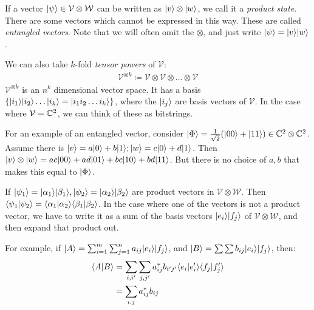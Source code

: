 \documentclass[10pt,a4paper]{article}
\begin{document}
If a vector $|\psi\rangle \in \mathcal{V}\otimes\mathcal{W}$ can be written as $|v\rangle\otimes |w\rangle$, we call it a \emph{product state}. There are some vectors which cannot be expressed in this way. These are called \emph{entangled vectors}. Note that we will often omit the $\otimes$, and just write $|\psi\rangle = |v\rangle|w\rangle$.

We can also take $k$-fold \emph{tensor powers} of $\mathcal{V}$:
\begin{align*}
\mathcal{V}^{\otimes k} \coloneqq \mathcal{V}\otimes \mathcal{V}\otimes\ldots \otimes \mathcal{V}
\end{align*}
$\mathcal{V}^{\otimes k}$ is an $n^k$ dimensional vector space. It has a basis $\{|i_1\rangle|i_2\rangle\ldots|i_k\rangle = |i_1i_2\ldots i_k\rangle\}$, where the $|i_j\rangle$ are basis vectors of $\mathcal{V}$. In the case where $\mathcal{V} = \mathbb{C}^2$, we can think of these as bitstrings.

For an example of an entangled vector, consider $|\Phi\rangle = \frac{1}{\sqrt{2}}(|00\rangle + |11\rangle) \in \mathbb{C}^2 \otimes \mathbb{C}^2$. Assume there is $|v\rangle = a|0\rangle + b|1\rangle; |w\rangle = c|0\rangle + d|1\rangle$. Then $|v\rangle\otimes|w\rangle = ac|00\rangle+ad|01\rangle+bc|10\rangle+bd|11\rangle$. But there is no choice of $a, b$ that makes this equal to $|\Phi\rangle$.

If $|\psi_1\rangle = |\alpha_1\rangle|\beta_1\rangle, |\psi_2\rangle = |\alpha_2\rangle|\beta_2\rangle$ are product vectors in $\mathcal{V}\otimes\mathcal{W}$. Then $\langle \psi_1 | \psi_2 \rangle = \langle \alpha_1 | \alpha_2 \rangle\langle \beta_1 | \beta_2 \rangle$. In the case where one of the vectors is not a product vector, we have to write it as a sum of the basis vectors $|e_i\rangle|f_j\rangle$ of $\mathcal{V}\otimes\mathcal{W}$, and then expand that product out.

For example, if $|A\rangle = \sum_{i=1}^m \sum_{j=1}^n a_{ij}|e_i\rangle|f_j\rangle$, and $|B\rangle = \sum\sum b_{ij} |e_i\rangle|f_j\rangle$, then:
\begin{align*}
\langle A | B \rangle &= \sum_{i,i'}\sum_{j,j'} a_{ij}^*b_{i'j'} \langle e_i | e_i' \rangle\langle f_j | f_j' \rangle\\
&= \sum_{i,j} a_{ij}^* b_{ij}
\end{align*} 
\end{document}
